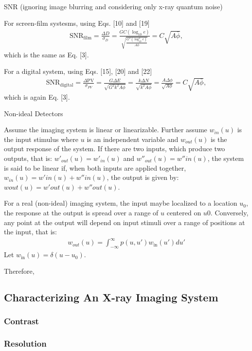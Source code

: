 \documentclass[mphy386-notes.tex]{subfiles}
\begin{document}
SNR (ignoring image blurring and considering only x-ray quantum noise)

For screen-film systesms, using Eqs. [10] and [19]
\begin{align}
  \text{SNR}_{\text{film}} = \frac{\Delta D}{\sigma_D} = \frac{GC(\log_{10}e)}{\sqrt{\frac{G^2(\log_{10}^2e)}{A\bar{\phi}}}} = C\sqrt{A\bar{\phi}},
\end{align}
which is the same as Eq. [3]. 

For a digital system, using Eqs. [15], [20] and [22]
\begin{align}
  \text{SNR}_{\text{digital}} = \frac{\Delta \text{PV}}{\sigma_{PV}} = \frac{G\Delta E}{\sqrt{G^2 k^2 A\phi}} = \frac{k\Delta N}{\sqrt{k^2 A\phi}} = \frac{A\Delta \phi}{\sqrt{A\phi}} = C\sqrt{A\bar{\phi}},
\end{align}
which is again Eq. [3].

Non-ideal Detectors

Assume the imaging system is linear or linearizable. Further assume $w_{in}(u)$
is the input stimulus where $u$ is an independent variable and $w_{out}(u)$ is
the output response of the system. If there are two inputs, which produce two
outputs, that is: $w'_{out}(u) = w'_{in}(u)$ and $w''_{out}(u) = w''in(u)$, the
system is said to be linear if, when both inputs are applied together, $w_{in}(u) =
w'in(u) + w''in(u)$, the output is given by: $wout(u) = w'out(u) + w''out(u)$.

For a real (non-ideal) imaging system, the input maybe localized to a location
$u_0$, the response at the output is spread over a range of $u$ centered on
$u0$. Conversely, any point at the output will depend on input stimuli over a
range of positions at the input, that is:
\begin{align*}
  w_{out}(u) = \int_{-\infty}^{\infty} p(u, u') w_{\text{in}}(u')du'
\end{align*}
Let $w_{\text{in}}(u) = \delta(u - u_0)$. 


Therefore,


\subsection{Characterizing An X-ray Imaging System}
\subsubsection{Contrast}
\subsubsection{Resolution}
\end{document}
